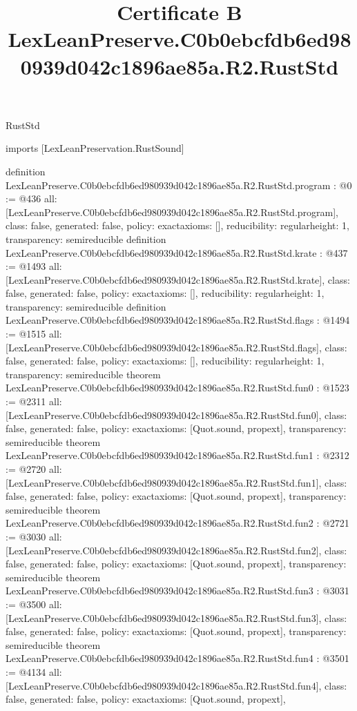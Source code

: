 \begin{lexlean}{RustStd}
\title{Certificate B LexLeanPreserve.C0b0ebcfdb6ed980939d042c1896ae85a.R2.RustStd}
\begin{coremodule}
imports [LexLeanPreservation.RustSound]

definition LexLeanPreserve.C0b0ebcfdb6ed980939d042c1896ae85a.R2.RustStd.program : @0 := @436 {
  all: [LexLeanPreserve.C0b0ebcfdb6ed980939d042c1896ae85a.R2.RustStd.program],
  class: false,
  generated: false,
  policy: exact{axioms: []},
  reducibility: regular{height: 1},
  transparency: semireducible
}
definition LexLeanPreserve.C0b0ebcfdb6ed980939d042c1896ae85a.R2.RustStd.krate : @437 := @1493 {
  all: [LexLeanPreserve.C0b0ebcfdb6ed980939d042c1896ae85a.R2.RustStd.krate],
  class: false,
  generated: false,
  policy: exact{axioms: []},
  reducibility: regular{height: 1},
  transparency: semireducible
}
definition LexLeanPreserve.C0b0ebcfdb6ed980939d042c1896ae85a.R2.RustStd.flags : @1494 := @1515 {
  all: [LexLeanPreserve.C0b0ebcfdb6ed980939d042c1896ae85a.R2.RustStd.flags],
  class: false,
  generated: false,
  policy: exact{axioms: []},
  reducibility: regular{height: 1},
  transparency: semireducible
}
theorem LexLeanPreserve.C0b0ebcfdb6ed980939d042c1896ae85a.R2.RustStd.fun0 : @1523 := @2311 {
  all: [LexLeanPreserve.C0b0ebcfdb6ed980939d042c1896ae85a.R2.RustStd.fun0],
  class: false,
  generated: false,
  policy: exact{axioms: [Quot.sound, propext]},
  transparency: semireducible
}
theorem LexLeanPreserve.C0b0ebcfdb6ed980939d042c1896ae85a.R2.RustStd.fun1 : @2312 := @2720 {
  all: [LexLeanPreserve.C0b0ebcfdb6ed980939d042c1896ae85a.R2.RustStd.fun1],
  class: false,
  generated: false,
  policy: exact{axioms: [Quot.sound, propext]},
  transparency: semireducible
}
theorem LexLeanPreserve.C0b0ebcfdb6ed980939d042c1896ae85a.R2.RustStd.fun2 : @2721 := @3030 {
  all: [LexLeanPreserve.C0b0ebcfdb6ed980939d042c1896ae85a.R2.RustStd.fun2],
  class: false,
  generated: false,
  policy: exact{axioms: [Quot.sound, propext]},
  transparency: semireducible
}
theorem LexLeanPreserve.C0b0ebcfdb6ed980939d042c1896ae85a.R2.RustStd.fun3 : @3031 := @3500 {
  all: [LexLeanPreserve.C0b0ebcfdb6ed980939d042c1896ae85a.R2.RustStd.fun3],
  class: false,
  generated: false,
  policy: exact{axioms: [Quot.sound, propext]},
  transparency: semireducible
}
theorem LexLeanPreserve.C0b0ebcfdb6ed980939d042c1896ae85a.R2.RustStd.fun4 : @3501 := @4134 {
  all: [LexLeanPreserve.C0b0ebcfdb6ed980939d042c1896ae85a.R2.RustStd.fun4],
  class: false,
  generated: false,
  policy: exact{axioms: [Quot.sound, propext]},
}
\end{coremodule}
\end{lexlean}
